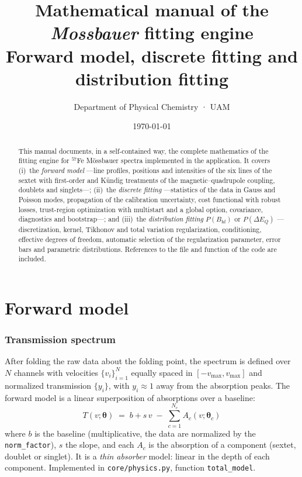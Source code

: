 \documentclass[11pt,a4paper]{article}
\title{\textbf{Mathematical manual of the \emph{Mossbauer} fitting engine}\\[3pt]
\large Forward model, discrete fitting and distribution fitting}
\author{Department of Physical Chemistry · UAM}
\date{\today}
\newcommand{\BHF}{B_{\mathrm{hf}}}
\newcommand{\dEQ}{\Delta E_{Q}}
\newcommand{\code}[1]{\texttt{\small #1}}
\newcommand{\file}[1]{\textcolor{black!70}{\texttt{\small #1}}}
\begin{document}
\maketitle

\begin{abstract}\noindent
This manual documents, in a self-contained way, the complete mathematics of the
fitting engine for $^{57}$Fe Mössbauer spectra implemented in the application. It
covers (i)~the \emph{forward model} —line profiles, positions and intensities of the
six lines of the sextet with first-order and Kündig treatments of the
magnetic–quadrupole coupling, doublets and singlets—; (ii)~the \emph{discrete
fitting} —statistics of the data in Gauss and Poisson modes, propagation of the
calibration uncertainty, cost functional with robust losses,
trust-region optimization with multistart and a global option,
covariance, diagnostics and bootstrap—; and (iii)~the \emph{distribution fitting}
$P(\BHF)$ or $P(\dEQ)$ —discretization, kernel, Tikhonov and total
variation regularization, conditioning, effective degrees of freedom, automatic
selection of the regularization parameter, error bars and parametric
distributions. References to the file and function of the code are included.
\end{abstract}

\tableofcontents
\bigskip

\part{Forward model}

\section{Transmission spectrum}\label{sec:fwd}

After folding the raw data about the folding point, the spectrum is
defined over $N$ channels with velocities $\{v_i\}_{i=1}^{N}$ equally spaced in
$[-v_{\max}, v_{\max}]$ and normalized transmission $\{y_i\}$, with $y_i\approx 1$
away from the absorption peaks. The forward model is a linear superposition of
absorptions over a baseline:
\begin{equation}
  \boxed{\;
  T(v;\bm\theta) \;=\; b + s\,v \;-\; \sum_{c=1}^{N_c} A_c(v;\bm\theta_c)
  \;}
  \label{eq:Tmodel}
\end{equation}
where $b$ is the baseline (multiplicative, the data are normalized by the
\code{norm\_factor}), $s$ the slope, and each $A_c$ is the absorption of a
component (sextet, doublet or singlet). It is a \emph{thin absorber}
model: linear in the depth of each component. Implemented in
\file{core/physics.py}, function \code{total\_model}.
\end{document}
